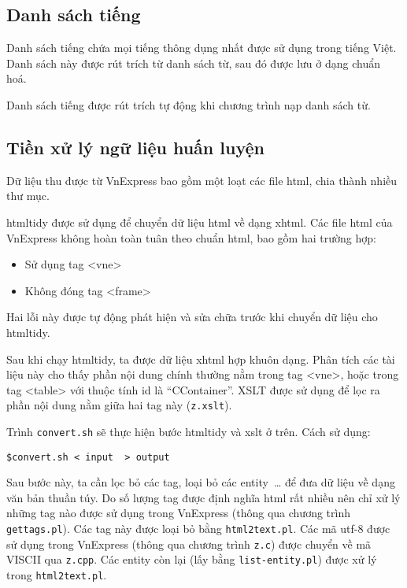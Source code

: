 \documentclass[a4paper,oneside]{book} %
\theoremstyle{break}
\begin{document}
\subsection{Danh sách tiếng}
\label{sub:syllable-list}

Danh sách tiếng chứa mọi tiếng thông dụng nhất được sử dụng trong
tiếng Việt. Danh sách này được rút trích từ danh sách từ, sau đó được
lưu ở dạng chuẩn hoá.

Danh sách tiếng được rút trích tự động khi chương trình nạp danh sách
từ.



\subsection{Tiền xử lý ngữ liệu huấn luyện}
\label{sec:training-data-preprocessing}

Dữ liệu thu được từ VnExpress bao gồm một loạt các file html, chia
thành nhiều thư mục.

htmltidy được sử dụng để chuyển dữ liệu html về dạng xhtml. Các file
html của VnExpress không hoàn toàn tuân theo chuẩn html, bao gồm hai
trường hợp:

\begin{itemize}
\item Sử dụng tag <vne>
\item Không đóng tag <frame>
\end{itemize}

Hai lỗi này được tự động phát hiện và sửa chữa trước khi chuyển dữ
liệu cho htmltidy.

Sau khi chạy htmltidy, ta được dữ liệu xhtml hợp khuôn dạng. Phân tích
các tài liệu này cho thấy phần nội dung chính thường nằm trong tag
<vne>, hoặc trong tag <table> với thuộc tính id là
``CContainer''. XSLT được sử dụng để lọc ra phần nội dung nằm giữa hai
tag này (\verb#z.xslt#).

Trình \verb#convert.sh# sẽ thực hiện bước htmltidy và xslt ở trên. Cách sử
dụng:
\begin{verbatim}
$convert.sh < input  > output
\end{verbatim}

Sau bước này, ta cần lọc bỏ các tag, loại bỏ các entity~\ldots{} để
đưa dữ liệu về dạng văn bản thuần túy. Do số lượng tag được định nghĩa
html rất nhiều nên chỉ xử lý những tag nào được sử dụng trong
VnExpress (thông qua chương trình \verb#gettags.pl#). Các tag này được loại
bỏ bằng \verb#html2text.pl#. Các mã utf-8 được sử dụng trong
VnExpress (thông qua chương trình \verb#z.c#) được chuyển về mã VISCII
qua \verb#z.cpp#. Các entity còn lại (lấy bằng \verb#list-entity.pl#)
được xử lý trong \verb#html2text.pl#.
\end{document}
